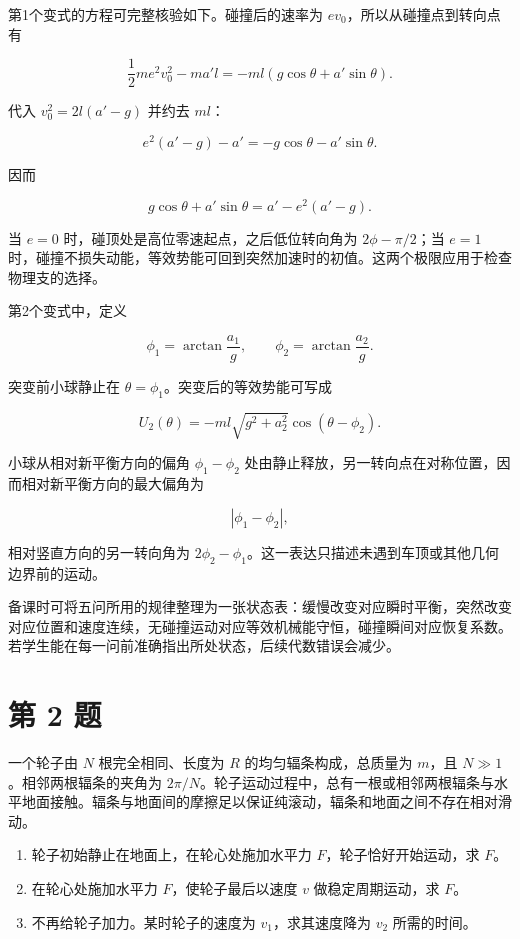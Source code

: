 \documentclass[12pt,a4paper,UTF8]{ctexart}
\newcommand{\tightlist}{\setlength{\itemsep}{0pt}\setlength{\parskip}{0pt}}
\begin{document}
第1个变式的方程可完整核验如下。碰撞后的速率为
\(ev_0\)，所以从碰撞点到转向点有

\[\frac12me^2v_0^2-ma'l
=-ml(g\cos\theta+a'\sin\theta).\]

代入 \(v_0^2=2l(a'-g)\) 并约去 \(ml\)：

\[e^2(a'-g)-a'
=-g\cos\theta-a'\sin\theta.\]

因而

\[\boxed{g\cos\theta+a'\sin\theta
=a'-e^2(a'-g)}.\]

当 \(e=0\) 时，碰顶处是高位零速起点，之后低位转向角为
\(2\phi-\pi/2\)；当 \(e=1\)
时，碰撞不损失动能，等效势能可回到突然加速时的初值。这两个极限应用于检查物理支的选择。

第2个变式中，定义

\[\phi_1=\arctan\frac{a_1}{g},\qquad
\phi_2=\arctan\frac{a_2}{g}.\]

突变前小球静止在 \(\theta=\phi_1\)。突变后的等效势能可写成

\[U_2(\theta)=-ml\sqrt{g^2+a_2^2}\cos(\theta-\phi_2).\]

小球从相对新平衡方向的偏角 \(\phi_1-\phi_2\)
处由静止释放，另一转向点在对称位置，因而相对新平衡方向的最大偏角为

\[\boxed{|\phi_1-\phi_2|},\]

相对竖直方向的另一转向角为
\(2\phi_2-\phi_1\)。这一表达只描述未遇到车顶或其他几何边界前的运动。

备课时可将五问所用的规律整理为一张状态表：缓慢改变对应瞬时平衡，突然改变对应位置和速度连续，无碰撞运动对应等效机械能守恒，碰撞瞬间对应恢复系数。若学生能在每一问前准确指出所处状态，后续代数错误会减少。

\newpage

\section{第 2 题}\label{ux7b2c-2-ux9898}

一个轮子由 \(N\) 根完全相同、长度为 \(R\) 的均匀辐条构成，总质量为
\(m\)，且 \(N\gg1\)。相邻两根辐条的夹角为
\(2\pi/N\)。轮子运动过程中，总有一根或相邻两根辐条与水平地面接触。辐条与地面间的摩擦足以保证纯滚动，辐条和地面之间不存在相对滑动。

\begin{enumerate}
\def\labelenumi{\arabic{enumi}.}
\tightlist
\item
  轮子初始静止在地面上，在轮心处施加水平力 \(F\)，轮子恰好开始运动，求
  \(F\)。
\item
  在轮心处施加水平力 \(F\)，使轮子最后以速度 \(v\) 做稳定周期运动，求
  \(F\)。
\item
  不再给轮子加力。某时轮子的速度为 \(v_1\)，求其速度降为 \(v_2\)
  所需的时间。
\end{enumerate}
\end{document}
